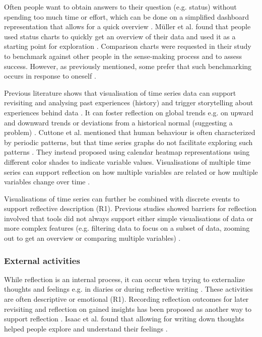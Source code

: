 Often people want to obtain answers to their question (e.g. status) without spending too much time or effort, which can be done on a simplified dashboard representation that allows for a quick overview \cite{Cuttone}. M{\"u}ller et al. found that people used status charts to quickly get an overview of their data and used it as a starting point for exploration \cite{Muller}. Comparison charts were requested in their study to benchmark against other people in the sense-making process and to assess success. However, as previously mentioned, some prefer that such benchmarking occurs in response to oneself \cite{Ancker2015}. 

Previous literature shows that visualisation of time series data can support revisiting and analysing past experiences (history) and trigger storytelling about experiences behind data \cite{Rivera, Muller}. It can foster reflection on global trends e.g. on upward and downward trends or deviations from a historical normal (suggesting a problem) \cite{Rivera}. Cuttone et al. mentioned that human behaviour is often characterized by periodic patterns, but that time series graphs do not facilitate exploring such patterns \cite{Cuttone}. They instead proposed using calendar heatmap representations using different color shades to indicate variable values. Visualisations of multiple time series can support reflection on how multiple variables are related or how multiple variables change over time \cite{Cuttone}. 

Visualisations of time series can further be combined with discrete events \cite{Sorensen} to support reflective description (R1). Previous studies showed barriers for reflection involved that tools did not always support either simple visualisations of data or more complex features (e.g. filtering data to focus on a subset of data, zooming out to get an overview or comparing multiple variables) \cite{Li2011, MacLeod2014}. 

\subsubsection{External activities}
While reflection is an internal process, it can occur when trying to externalize thoughts and feelings e.g. in diaries or during reflective writing \cite{Mols}. These activities are often descriptive or emotional (R1). Recording reflection outcomes for later revisiting and reflection on gained insights has been proposed as another way to support reflection \cite{Isaac, Muller}. Isaac et al. found that allowing for writing down thoughts helped people explore and understand their feelings \cite{Isaac}. 

